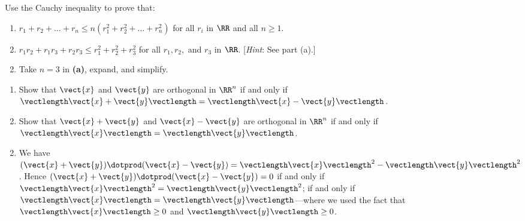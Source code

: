 \begin{multicols}{2}
\begin{ex}
Use the Cauchy inequality to prove that:

\begin{enumerate}[label={\alph*.}]
\item  $r_1 + r_2 + \dots + r_n \leq n(r_1^2 + r_2^2 + \dots + r_n^2)$ for all $ r_i $ in $\RR$ and all $n \geq 1$.

\item $r_1r_2 + r_1r_3 + r_2r_3 \leq r_1^2 + r_2^2 + r_3^2$ for all $r_1, r_2,$ and $r_3$ in $\RR$. [\textit{Hint}: See part (a).]

\end{enumerate}
\begin{sol}
\begin{enumerate}[label={\alph*.}]
\setcounter{enumi}{1}
\item  Take $n = 3$ in \textbf{(a)}, expand, and simplify.

\end{enumerate}
\end{sol}
\end{ex}

\begin{ex}
\begin{enumerate}[label={\alph*.}]
\item Show that $\vect{x}$ and $\vect{y}$ are orthogonal in $\RR^n$ if and only if $\vectlength\vect{x} + \vect{y}\vectlength = \vectlength\vect{x} - \vect{y}\vectlength$.

\item Show that $\vect{x} + \vect{y}$ and $\vect{x} - \vect{y}$ are orthogonal in $\RR^n$ if and only if $\vectlength\vect{x}\vectlength = \vectlength\vect{y}\vectlength$.

\end{enumerate}
\begin{sol}
\begin{enumerate}[label={\alph*.}]
\setcounter{enumi}{1}
\item  We have $(\vect{x} + \vect{y}) \dotprod (\vect{x} - \vect{y}) = \vectlength\vect{x}\vectlength^{2} - \vectlength\vect{y}\vectlength^{2}$. Hence $(\vect{x} + \vect{y}) \dotprod (\vect{x} - \vect{y}) = 0$ if and only if $\vectlength\vect{x}\vectlength^{2} = \vectlength\vect{y}\vectlength^{2}$; if and only if $\vectlength\vect{x}\vectlength = \vectlength\vect{y}\vectlength$---where we used the fact that $\vectlength\vect{x}\vectlength \geq 0$ and $\vectlength\vect{y}\vectlength \geq 0$.

\end{enumerate}
\end{sol}
\end{ex}


\end{multicols}
